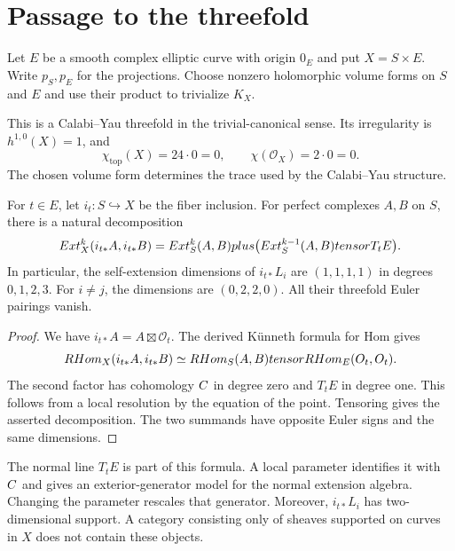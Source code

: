 \section{Passage to the threefold}
\label{subsec:k3xe-compact-target}

\begin{definition}
\label{def:k3xe-threefold}
Let $E$ be a smooth complex elliptic curve with origin $0_E$ and put
$X=S\times E$.  Write $p_S,p_E$ for the projections.  Choose nonzero
holomorphic volume forms on $S$ and $E$ and use their product to
trivialize $K_X$.
\end{definition}

This is a Calabi--Yau threefold in the trivial-canonical sense.  Its
irregularity is $h^{1,0}(X)=1$, and
\[
\chi_{\mathrm{top}}(X)=24\cdot0=0,
\qquad \chi(\mathcal O_X)=2\cdot0=0.
\]
The chosen volume form determines the trace used by the Calabi--Yau
structure.

\begin{proposition}
\label{k3:prop:fiber-ext}
For $t\in E$, let $i_t:S\hookrightarrow X$ be the fiber inclusion.
For perfect complexes $A,B$ on $S$, there is a natural decomposition
\[
Ext^k_X(i_{t*}A,i_{t*}B)
=Ext^k_S(A,B)plus
\bigl(Ext^{k-1}_S(A,B)tensor T_tE\bigr).
\]
In particular, the self-extension dimensions of $i_{t*}L_i$ are
$(1,1,1,1)$ in degrees $0,1,2,3$.  For $i\ne j$, the dimensions
are $(0,2,2,0)$.  All their threefold Euler pairings vanish.
\end{proposition}

\begin{proof}
We have $i_{t*}A=A\boxtimes\mathcal O_t$.  The derived K\"unneth
formula for Hom gives
\[
RHom_X(i_{t*}A,i_{t*}B)
\simeq RHom_S(A,B)tensor RHom_E(O_t,O_t).
\]
The second factor has cohomology $C$ in degree zero and $T_tE$ in
degree one.  This follows from a local resolution by the equation of
the point.  Tensoring gives the asserted decomposition.  The two
summands have opposite Euler signs and the same dimensions.
\end{proof}

The normal line $T_tE$ is part of this formula.  A local parameter
identifies it with $C$ and gives an exterior-generator model for the
normal extension algebra.  Changing the parameter rescales that
generator.  Moreover, $i_{t*}L_i$ has two-dimensional support.
A category consisting only of sheaves supported on curves in $X$
does not contain these objects.

